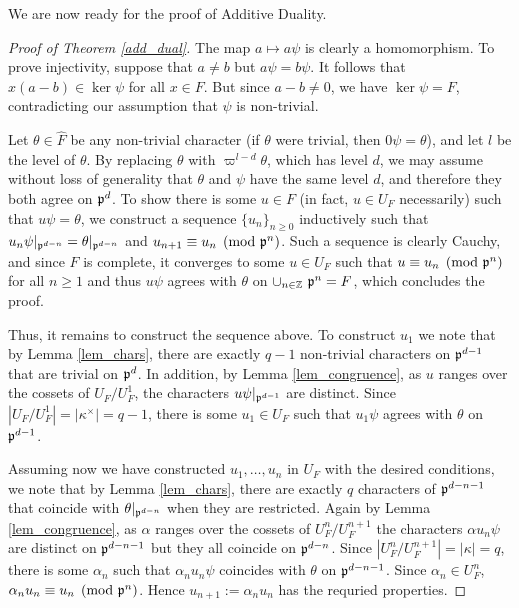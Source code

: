 We are now ready for the proof of Additive Duality.

\begin{proof}[Proof of Theorem \ref{add_dual}]
    The map $a\mapsto a\psi$ is clearly a homomorphism. To prove injectivity, suppose that $a\neq b$ but $a\psi=b\psi$. It follows that $x(a-b)\in\ker\psi$ for all $x\in F$. But since $a-b\neq 0$, we have $\ker\psi=F$, contradicting our assumption that $\psi$ is non-trivial.

    Let $\theta\in\hat{F}$ be any non-trivial character (if $\theta$ were trivial, then $0\psi=\theta$), and let $l$ be the level of $\theta$. By replacing $\theta$ with $\varpi^{l-d}\theta$, which has level $d$, we may assume without loss of generality that $\theta$ and $\psi$ have the same level $d$, and therefore they both agree on $\mathfrak{p}^d$. To show there is some $u\in F$ (in fact, $u\in U_F$ necessarily) such that $u\psi=\theta$,   we construct a sequence $\{u_n\}_{n\geq0}$ inductively such that $u_n\psi|_{\mathfrak{p}^{d-n}}=\theta|_{\mathfrak{p}^{d-n}}$ and $u_{n+1}\equiv u_n\pmod{\mathfrak{p}^n}$. Such a sequence is clearly Cauchy, and since $F$ is complete, it converges to some $u\in U_F$ such that $u\equiv u_n\pmod{\mathfrak{p}^n}$ for all $n\geq 1$ and thus $u\psi$ agrees with $\theta$ on $\cup_{n\in\mathbb{Z}}\ \mathfrak{p}^n=F$, which concludes the proof.

    Thus, it remains to construct the sequence above. To construct $u_1$ we note that by Lemma \ref{lem_chars}, there are exactly $q-1$ non-trivial characters on $\mathfrak{p}^{d-1}$ that are trivial on $\mathfrak{p}^d$. In addition, by Lemma \ref{lem_congruence}, as $u$ ranges over the cossets of $U_F/U_F^1$, the characters $u\psi|_{\mathfrak{p}^{d-1}}$ are distinct. Since $|U_F/U_F^1|=|\kappa^{\times}|=q-1$, there is some $u_1\in U_F$ such that $u_1\psi$ agrees with $\theta$ on $\mathfrak{p}^{d-1}$. 
    
    Assuming now we have constructed $u_1,\ldots,u_n$ in $U_F$ with the desired conditions, we note that by Lemma \ref*{lem_chars}, there are exactly $q$ characters of $\mathfrak{p}^{d-n-1}$ that coincide with $\theta|_{\mathfrak{p}^{d-n}}$ when they are restricted. Again by Lemma \ref*{lem_congruence}, as $\alpha$ ranges over the cossets of $U_F^n/U_F^{n+1}$ the characters $\alpha u_n\psi$ are distinct on $\mathfrak{p}^{d-n-1}$ but they all coincide on $\mathfrak{p}^{d-n}$. Since $|U_F^n/U_F^{n+1}|=|\kappa|=q$, there is some $\alpha_n$ such that $\alpha_n u_n\psi$ coincides with $\theta$ on $\mathfrak{p}^{d-n-1}$. Since $\alpha_n\in U_F^n$, $\alpha_n u_n\equiv u_n\pmod{\mathfrak{p}^n}$. Hence $u_{n+1}:=\alpha_n u_n$ has the requried properties.
\end{proof}